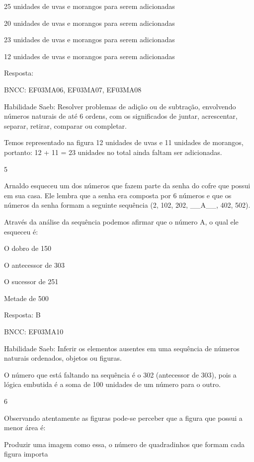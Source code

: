 \begin{escolha}
\begin{escolha}
\begin{escolha}
\item
  25 unidades de uvas e morangos para serem adicionadas
\item
  20 unidades de uvas e morangos para serem adicionadas
\item
  23 unidades de uvas e morangos para serem adicionadas
\item
  12 unidades de uvas e morangos para serem adicionadas
\end{escolha}

Resposta:

BNCC: EF03MA06, EF03MA07, EF03MA08

Habilidade Saeb: Resolver problemas de adição ou de subtração,
envolvendo números naturais de até 6 ordens, com os significados de
juntar, acrescentar, separar, retirar, comparar ou completar.

Temos representado na figura 12 unidades de uvas e 11 unidades de
morangos, portanto: 12 + 11 = 23 unidades no total ainda faltam ser
adicionadas.

\num{5}

Arnaldo esqueceu um dos números que fazem parte da senha do cofre que
possui em sua casa. Ele lembra que a senha era composta por 6 números e
que os números da senha formam a seguinte sequência (2, 102, 202,
\_\_A\_\_, 402, 502).

Através da análise da sequência podemos afirmar que o número A, o qual
ele esqueceu é:

\begin{escolha}

\item
  O dobro de 150
\item
  O antecessor de 303
\item
  O sucessor de 251
\item
  Metade de 500
\end{escolha}

Resposta: B

BNCC: EF03MA10

Habilidade Saeb: Inferir os elementos ausentes em uma sequência de
números naturais ordenados, objetos ou figuras.

O número que está faltando na sequência é o 302 (antecessor de 303),
pois a lógica embutida é a soma de 100 unidades de um número para o
outro.

\num{6}

Observando atentamente as figuras pode-se perceber que a figura que
possui a menor área é:

Produzir uma imagem como essa, o número de quadradinhos que formam cada
figura importa


\end{escolha}
\end{escolha}
